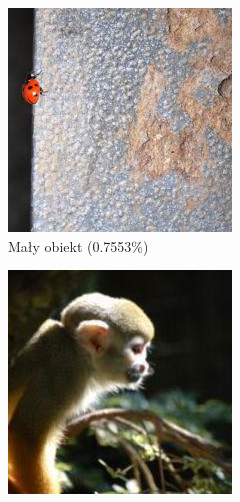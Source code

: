\begin{figure}
	\centering
	\begin{subfigure}[b]{0.3\textwidth}
		\includegraphics[width=.9\textwidth]{img/examples/size_category_small}
		\caption{Mały obiekt (0.7553\%)}  \label{}
	\end{subfigure}
	\begin{subfigure}[b]{0.3\textwidth}
		\centering\includegraphics[width=.9\textwidth]{img/examples/size_category_medium}

\end{subfigure}
\end{figure}
